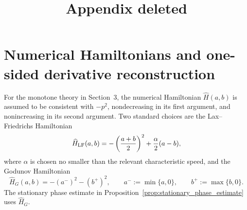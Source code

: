 \documentclass[11pt]{article}
\title{Appendix deleted}
\begin{document}
\date{}
\maketitle

\section{Numerical Hamiltonians and one-sided derivative reconstruction}\label{app:hamiltonian_weno}

For the monotone theory in Section~3, the numerical Hamiltonian \(\widehat H(a,b)\) is assumed to be consistent with \(-p^2\), nondecreasing in its first argument, and nonincreasing in its second argument.  Two standard choices are the Lax--Friedrichs Hamiltonian
\begin{equation}\label{eq:app_LF_H_new}
    \widehat H_{\rm LF}(a,b)
    =-\left(\frac{a+b}{2}\right)^2+\frac{\alpha}{2}(a-b),
\end{equation}
where \(\alpha\) is chosen no smaller than the relevant characteristic speed, and the Godunov Hamiltonian
\begin{equation}\label{eq:app_Godunov_H_new}
    \widehat H_G(a,b)=-(a^-)^2-(b^+)^2,
    \qquad
    a^-:=\min\{a,0\},
    \qquad
    b^+:=\max\{b,0\}.
\end{equation}
The stationary phase estimate in Proposition~\ref{prop:stationary_phase_estimate} uses \(\widehat H_G\).
\end{document}
